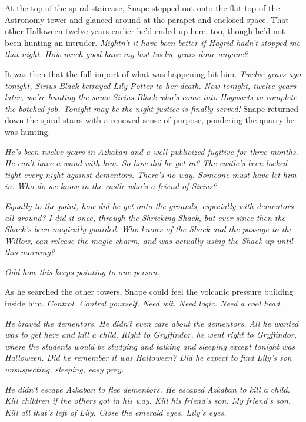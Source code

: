 At the top of the spiral staircase, Snape stepped out onto the flat top of the Astronomy tower and glanced around at the parapet and enclosed space. That other Halloween twelve years earlier he'd ended up here, too, though he'd not been hunting an intruder. \emph{Mightn't it have been better if Hagrid hadn't stopped me that night. How much good have my last twelve years done anyone?}

It was then that the full import of what was happening hit him. \emph{Twelve years ago tonight, Sirius Black betrayed Lily Potter to her death. Now tonight, twelve years later, we're hunting the same Sirius Black who's come into Hogwarts to complete the botched job. Tonight may be the night justice is finally served!} Snape returned down the spiral stairs with a renewed sense of purpose, pondering the quarry he was hunting.

\emph{He's been twelve years in Azkaban and a well-publicized fugitive for three months. He can't have a wand with him. So how did he get in? The castle's been locked tight every night against dementors. There's no way. Someone must have let him in. Who do we know in the castle who's a friend of Sirius?}

\emph{Equally to the point, how did he get onto the grounds, especially with dementors all around? I did it once, through the Shrieking Shack, but ever since then the Shack's been magically guarded. Who knows of the Shack and the passage to the Willow, can release the magic charm, and was actually using the Shack up until this morning?}

\emph{Odd how this keeps pointing to one person.}

As he searched the other towers, Snape could feel the volcanic pressure building inside him. \emph{Control. Control yourself. Need wit. Need logic. Need a cool head.}

\emph{He braved the dementors. He didn't even care about the dementors. All he wanted was to get here and kill a child. Right to Gryffindor, he went right to Gryffindor, where the students would be studying and talking and sleeping except tonight was Halloween. Did he remember it was Halloween? Did he expect to find Lily's son unsuspecting, sleeping, easy prey.}

\emph{He didn't escape Azkaban to flee dementors. He escaped Azkaban to kill a child. Kill children if the others got in his way. Kill his friend's son. My friend's son. Kill all that's left of Lily. Close the emerald eyes. Lily's eyes.}

